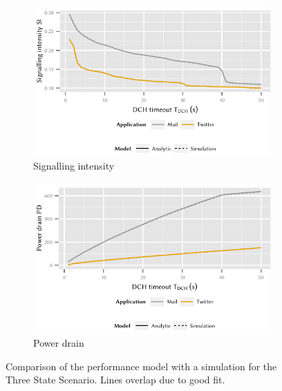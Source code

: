 \begin{figure}
	\begin{subfigure}[b]{\textwidth}
	\centering
	\includegraphics{network/performance_model/numerical_examples/figures/3state_tdch_si_analytic_simulative}
	\caption{Signalling intensity}\label{fig:network:performance_model:numerical_examples:validations:analytic_vs_simulation:signalling_intensity}
	\end{subfigure}

	\begin{subfigure}[b]{\textwidth}
	\centering
	\includegraphics{network/performance_model/numerical_examples/figures/3state_tdch_pd_analytic_simulative}
	\caption{Power drain}\label{fig:network:performance_model:numerical_examples:validations:analytic_vs_simulation:power_drain}
	\end{subfigure}

	\caption{Comparison of the performance model with a  simulation for the Three State Scenario. Lines overlap due to good fit.}\label{fig:network:performance_model:numerical_examples:validations:analytic_vs_simulation}
\end{figure}

